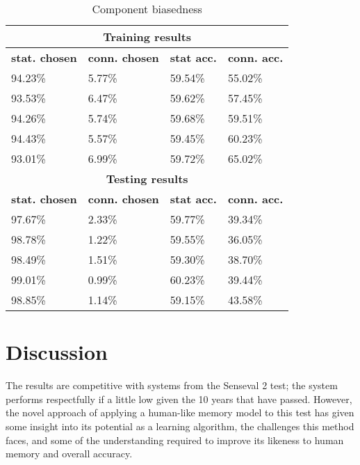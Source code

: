 \begin{table}[htp]
	\centering 
	\begin{tabular}{|l|l|l|l|}
		\hline
		\multicolumn{4}{|c|}{\bf Training results } \\ \hline
		{\bf stat. chosen } & {\bf conn. chosen } & {\bf stat acc.} & {\bf conn. acc.}\\ \hline
		94.23\%             & 5.77\%              &  59.54\%        & 55.02\% \\ \hline
		93.53\%             & 6.47\%              &  59.62\%        & 57.45\% \\ \hline
		94.26\%             & 5.74\%              &  59.68\%        & 59.51\% \\ \hline
		94.43\%             & 5.57\%              &  59.45\%        & 60.23\% \\ \hline
		93.01\%             & 6.99\%              &  59.72\%        & 65.02\% \\ \hline
	    \multicolumn{4}{|c|}{\bf Testing results } \\ \hline
		{\bf stat. chosen } & {\bf conn. chosen } & {\bf stat acc.} & {\bf conn. acc.}\\ \hline
		97.67\%             & 2.33\%              &  59.77\%        & 39.34\% \\ \hline
		98.78\%             & 1.22\%              &  59.55\%        & 36.05\% \\ \hline
		98.49\%             & 1.51\%              &  59.30\%        & 38.70\% \\ \hline
		99.01\%             & 0.99\%              &  60.23\%        & 39.44\% \\ \hline
		98.85\%             & 1.14\%              &  59.15\%        & 43.58\% \\ \hline
	\end{tabular}
	\caption{Component biasedness \label{table:BIASNESS}}
\end{table}

\section{Discussion}

The results are competitive with systems from the Senseval 2 test; the system
performs respectfully if a little low given the 10 years that have passed.
However, the novel approach of applying a human-like memory model to this test
has given some insight into its potential as a learning algorithm, the
challenges this method faces, and some of the understanding required to improve
its likeness to human memory and overall accuracy.

